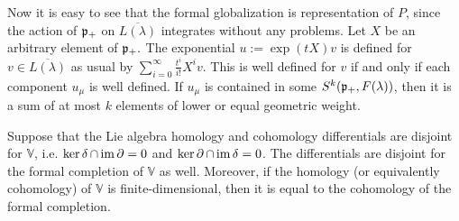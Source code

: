 Now it is easy to see that the formal globalization is representation of $P$, since the action of $\mathfrak{p}_+$ on $\overline{L(\lambda)}$ integrates without any problems. Let $X$ be an arbitrary element of $\mathfrak{p}_+.$ The exponential $u:=\exp(tX)v$ is defined for $v\in\overline{L(\lambda)}$ as usual by $\sum_{i=0}^\infty \frac{t^i}{i!} X^iv$. This is well defined for $v$ if and only if each component $u_\mu$ is well defined. If $u_\mu$ is contained in some $S^k(\mathfrak{p}_+,F(\lambda))$, then it is a sum of at most $k$ elements of lower or equal geometric weight.


\begin{proposition}
 Suppose that the Lie algebra homology and cohomology differentials are disjoint for $\mathbb{V}$, i.e. $\ker \operatorname{\delta} \cap \operatorname{\mathrm{im}} \operatorname{\partial} = 0$ and $\ker \operatorname{\partial} \cap \operatorname{\mathrm{im}} \operatorname{\delta} = 0$. The differentials are disjoint for the formal completion of $\mathbb{V}$ as well. Moreover, if the homology (or equivalently cohomology) of $\mathbb{V}$ is finite-dimensional, then it is equal to the cohomology of the formal completion.
\end{proposition}

